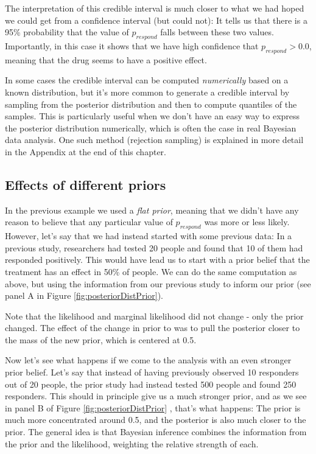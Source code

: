 \documentclass[12pt,]{book}
\theoremstyle{definition}
\theoremstyle{definition}
\theoremstyle{definition}
\theoremstyle{remark}
\begin{document}
The interpretation of this credible interval is much closer to what we had hoped we could get from a confidence interval (but could not): It tells us that there is a 95\% probability that the value of \(p_{respond}\) falls between these two values. Importantly, in this case it shows that we have high confidence that \(p_{respond} > 0.0\), meaning that the drug seems to have a positive effect.

In some cases the credible interval can be computed \emph{numerically} based on a known distribution, but it's more common to generate a credible interval by sampling from the posterior distribution and then to compute quantiles of the samples. This is particularly useful when we don't have an easy way to express the posterior distribution numerically, which is often the case in real Bayesian data analysis. One such method (rejection sampling) is explained in more detail in the Appendix at the end of this chapter.

\hypertarget{effects-of-different-priors}{%
\subsection{Effects of different priors}\label{effects-of-different-priors}}

In the previous example we used a \emph{flat prior}, meaning that we didn't have any reason to believe that any particular value of \(p_{respond}\) was more or less likely. However, let's say that we had instead started with some previous data: In a previous study, researchers had tested 20 people and found that 10 of them had responded positively. This would have lead us to start with a prior belief that the treatment has an effect in 50\% of people. We can do the same computation as above, but using the information from our previous study to inform our prior (see panel A in Figure \ref{fig:posteriorDistPrior}).

Note that the likelihood and marginal likelihood did not change - only the prior changed. The effect of the change in prior to was to pull the posterior closer to the mass of the new prior, which is centered at 0.5.

Now let's see what happens if we come to the analysis with an even stronger prior belief. Let's say that instead of having previously observed 10 responders out of 20 people, the prior study had instead tested 500 people and found 250 responders. This should in principle give us a much stronger prior, and as we see in panel B of Figure \ref{fig:posteriorDistPrior} , that's what happens: The prior is much more concentrated around 0.5, and the posterior is also much closer to the prior. The general idea is that Bayesian inference combines the information from the prior and the likelihood, weighting the relative strength of each.
\end{document}
